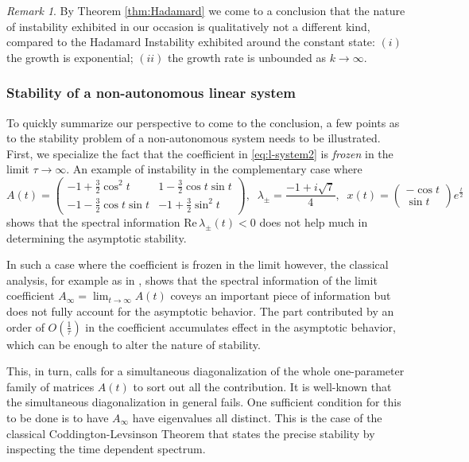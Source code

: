 \documentclass[a4paper,11pt]{article}
\theoremstyle{remark}
\newtheorem{remark}{Remark}[section]
\begin{document}
\begin{remark} By Theorem \ref{thm:Hadamard} we come to a conclusion that the nature of instability exhibited in our occasion is qualitatively not a different kind, compared to the Hadamard Instability exhibited around the constant state: $(i)$ the growth is exponential; $(ii)$ the growth rate is unbounded as $k \rightarrow \infty$.
\end{remark}

\subsubsection{Stability of a non-autonomous linear system}
To quickly summarize our perspective to come to the conclusion, a few points as to the stability problem of a non-autonomous system needs to be illustrated. First, we specialize the fact that the coefficient in \eqref{eq:l-system2} is {\it frozen} in the limit $\tau \rightarrow \infty$. An example of instability in the complementary case where
$$ 
A(t) = \left(\begin{array}{cc} -1 + \frac{3}{2}\cos^2 t & 1-\frac{3}{2}\cos t \sin t \\ -1 -\frac{3}{2}\cos t \sin t & -1 + \frac{3}{2}\sin^2 t \end{array}\right), \;\; \lambda_\pm = \frac{-1 + i\sqrt{7}}{4}, 
\; \; x(t) = \left(\begin{array}{c} -\cos t\\ \sin t \end{array}\right) e^{\tfrac{t}{2}}$$
shows that the spectral information  $\textrm{Re}\, \lambda_\pm(t)<0$ does not help much in determining the asymptotic stability.

In such a case where the coefficient is frozen in the limit however, the classical analysis, for example as in \cite{CL55}, shows that the spectral information of the limit coefficient $\displaystyle A_\infty=\lim_{t \rightarrow\infty} A(t)$ coveys an important piece of information but does not fully account for the asymptotic behavior. The part contributed by an order of $O(\tfrac{1}{\tau})$ in the coefficient accumulates effect in the asymptotic behavior, which can be enough to alter the nature of stability.

This, in turn, calls for a simultaneous diagonalization of the whole one-parameter family of matrices $A(t)$ to sort out all the contribution. It is well-known that the simultaneous diagonalization in general fails. One sufficient condition for this to be done is to have $A_\infty$ have eigenvalues all distinct. This is the case of the classical Coddington-Levsinson Theorem \cite{CL55} that states the precise stability by inspecting the time dependent spectrum.
\end{document}
